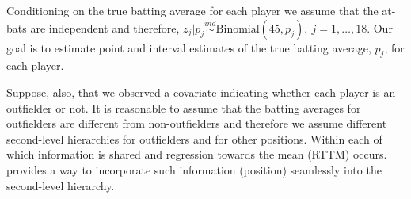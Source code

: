 \documentclass[article]{jss}
\begin{document}
Conditioning on the true batting average for each player we assume that the at-bats are independent and therefore, $z_{j}\vert p_{j}\stackrel{ind}{\sim} \textrm{Binomial}(45, p_{j}), ~j=1, \ldots, 18$. Our goal is to estimate point and interval estimates of the true batting average, $p_{j}$, for each player. %



Suppose, also, that we observed a covariate indicating whether each player is an outfielder or not. It is reasonable to assume that the batting averages for outfielders are different from non-outfielders and therefore we assume different second-level hierarchies for outfielders and for other positions. Within each of which information is shared and regression towards the mean (RTTM) occurs.  provides a way to incorporate such information (position) seamlessly into the second-level hierarchy.
\end{document}
